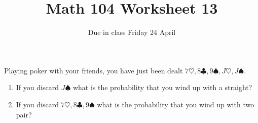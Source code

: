 \documentclass[12pt]{article}
\author{}\date{Due in class Friday 24 April}
\title{Math 104 Worksheet 13}\author{}
\begin{document}
\large
\thispagestyle{empty}
Playing poker with your friends,
you have just been dealt
$7\heartsuit,8\clubsuit,9\spadesuit,J\heartsuit,J\spadesuit$.
\begin{enumerate}
\item If you discard $J\spadesuit$ what is the probability
that you wind up with a straight?\\
\vspace{2in}
\item If you discard
$7\heartsuit,8\clubsuit,9\spadesuit$ what is the probability
that you wind up with two pair?
\end{enumerate}
\end{document}
